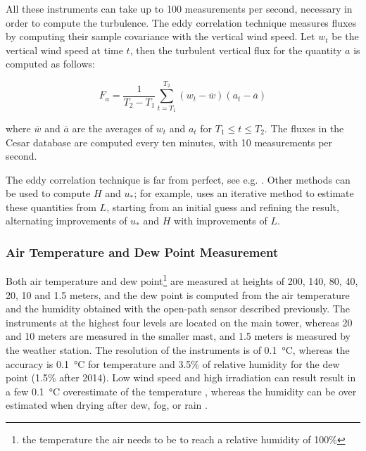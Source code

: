 \documentclass[a4paper]{book}
\begin{document}
All these instruments can take up to 100 measurements per second, necessary in order to compute the turbulence. The eddy correlation technique measures fluxes by computing their sample covariance with the vertical wind speed. Let $w_t$ be the vertical wind speed at time $t$, then the turbulent vertical flux for the quantity $a$ is computed as follows:

$$
F_a=\frac{1}{T_2-T_1}\sum_{t=T_1}^{T_2}(w_t-\overline{w})(a_t-\overline{a})
$$

\noindent where $\overline{w}$ and $\overline{a}$ are the averages of $w_t$ and $a_t$ for $T_1\leq t\leq T_2$. The fluxes in the Cesar database are computed every ten minutes, with 10 measurements per second.

The eddy correlation technique is far from perfect, see e.g. \citep{microhandbook, ed_co2}. Other methods can be used to compute $H$ and $u_*$; for example, \cite{cabauw_abl} uses an iterative method to estimate these quantities from $L$, starting from an initial guess and refining the result, alternating improvements of $u_*$ and $H$ with improvements of $L$.

\subsubsection{Air Temperature and Dew Point Measurement}
Both air temperature and dew point\footnote{the temperature the air needs to be to reach a relative humidity of 100\%} are measured at heights of 200, 140, 80, 40, 20, 10 and 1.5 meters, and the dew point is computed from the air temperature and the humidity obtained with the open-path sensor described previously. The instruments at the highest four levels are located on the main tower, whereas 20 and 10 meters are measured in the smaller mast, and 1.5 meters is measured by the weather station. The resolution of the instruments is of \SI{0.1}{\celsius}, whereas the accuracy is \SI{0.1}{\celsius} for temperature and 3.5\% of relative humidity for the dew point (1.5\% after 2014). Low wind speed and high irradiation can result result in a few \SI{0.1}{\celsius} overestimate of the temperature \citep{tempoverestimate}, whereas the humidity can be over estimated when drying after dew, fog, or rain \citep{cabauwinsitu}.
\end{document}
